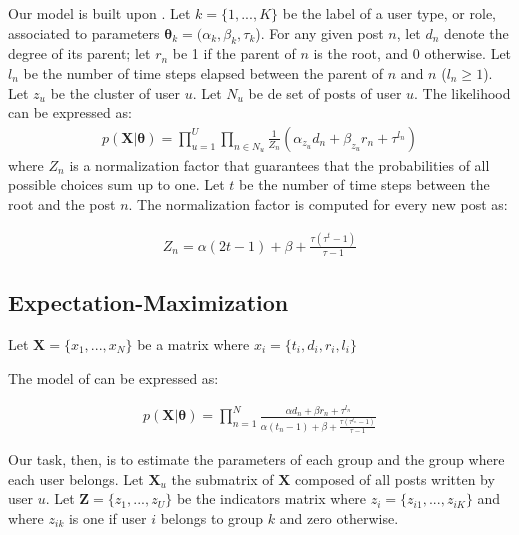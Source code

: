 \documentclass[smallextended]{svjour3}          %
\begin{document}
Our model is built upon \cite{Gomez2012}. Let $k=\{1,...,K\}$ be the label of a user type, or role, associated to parameters $\boldsymbol{\theta}_k = (\alpha_k, \beta_k, \tau_k$). For any given post $n$, let $d_n$ denote the degree of its parent; let $r_n$ be 1 if the parent of $n$ is the root, and 0 otherwise. Let $l_n$ be the number of time steps elapsed between the parent of $n$ and $n$ ($l_n \geq 1$). Let $z_u$ be the cluster of user $u$. Let $N_u$ be de set of posts of user $u$. The likelihood can be expressed as:
\begin{align*}
p(\mathbf{X} | \boldsymbol{\theta}) = 
\prod_{u=1}^U \prod_{n \in N_u} 
\frac{1}{Z_n}\left(\alpha_{z_u} d_n + \beta_{z_u}r_{n} + \tau^{l_n}\right)
\end{align*}
where $Z_n$ is a normalization factor that guarantees that the probabilities of all possible choices sum up to one. Let $t$ be the number of time steps between the root and the post $n$. The normalization factor is computed for every new post as:

\begin{align*}
Z_n =  \alpha(2t -1) + \beta + \frac{\tau(\tau^t-1)}{\tau-1}
\end{align*}


\subsection{Expectation-Maximization} 
Let $\mathbf{X} = \{x_1,...,x_N\}$ be a matrix where $x_i = \{t_i, d_i, r_i, l_i\}$

The model of \cite{Gomez2012} can be expressed as:

\begin{align}
p(\mathbf{X} | \boldsymbol{\theta}) = \prod_{n=1}^N
\frac{\alpha d_n + \beta r_n + \tau^{l_n}}{\alpha(t_n-1)+\beta + \frac{\tau(\tau^{t_n}-1)}{\tau-1}}
\end{align} 

Our task, then, is to estimate the parameters of each group and the group where each user belongs. Let $\mathbf{X}_u$ the submatrix of $\mathbf{X}$ composed of all posts written by user $u$. Let $\mathbf{Z} = \{z_1,...,z_U\}$ be the indicators matrix where $z_i=\{z_{i1},...,z_{iK}\}$ and where $z_{ik}$ is one if user $i$ belongs to group $k$ and zero otherwise.    
\end{document}
